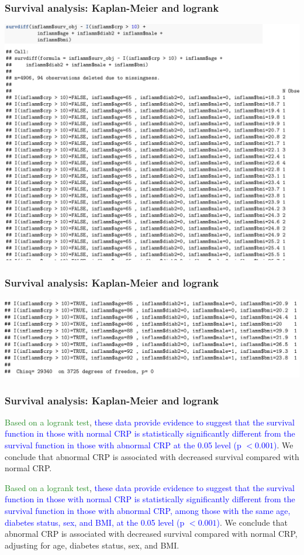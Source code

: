 \documentclass[12pt, 
hyperref={colorlinks=true, linkcolor=blue, urlcolor=cyan},dvipsnames]{beamer}
\begin{document}
\begin{frame}
\frametitle{Survival analysis: Kaplan-Meier and logrank}
\includegraphics[width = 1\textwidth]{figs/inflamm_logrank_crp_adjust_1.png}
\end{frame}

\begin{frame}
\frametitle{Survival analysis: Kaplan-Meier and logrank}
\includegraphics[width = 1\textwidth]{figs/inflamm_logrank_crp_adjust_3.png}
\end{frame}

\begin{frame}
\frametitle{Survival analysis: Kaplan-Meier and logrank}

\textcolor{ForestGreen}{Based on a logrank test}, \textcolor{blue}{these data provide evidence to suggest that the survival function in those with normal CRP is statistically significantly different from the survival function in those with abnormal CRP at the 0.05 level (p $< 0.001$)}. \textcolor{BurntOrange}{We conclude that abnormal CRP is associated with decreased survival compared with normal CRP}.

\textcolor{ForestGreen}{Based on a logrank test}, \textcolor{blue}{these data provide evidence to suggest that the survival function in those with normal CRP is statistically significantly different from the survival function in those with abnormal CRP, among those with the same age, diabetes status, sex, and BMI, at the 0.05 level (p $< 0.001$)}. \textcolor{BurntOrange}{We conclude that abnormal CRP is associated with decreased survival compared with normal CRP, adjusting for age, diabetes status, sex, and BMI}.
\end{frame}
\end{document}
